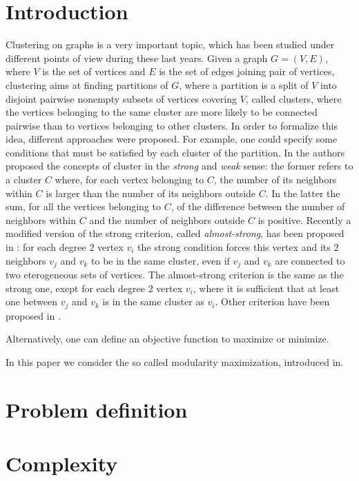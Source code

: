 \section{Introduction}
Clustering on graphs is a very important topic, which has been studied under different points of view during these last years. Given a graph $G=(V,E)$, where $V$ is the set of vertices and $E$ is the set of edges joining pair of vertices, clustering aims at finding partitions of $G$, where a partition is a split of $V$ into disjoint pairwise nonempty subsets of vertices covering $V$, called clusters, where the vertices belonging to the same cluster are more likely to be connected pairwise than to vertices belonging to other clusters. In order to formalize this idea, different approaches were proposed. 
For example, one could specify some conditions that must be satisfied by each cluster of the partition. In \cite{Radicchi} the authors proposed the concepts of cluster in the \emph{strong} and \emph{weak} sense: the former refers to a cluster $C$ where, for each vertex belonging to $C$, the number of its neighbors within $C$ is larger than the number of its neighbors outside $C$. In the latter the sum, for all the vertices belonging to $C$, of the difference between the number of neighbors within $C$ and the number of neighbors outside $C$ is positive. Recently a modified version of the strong criterion, called \emph{almost-strong}, has been proposed in \cite{PhysRevE.85.046113}: for each degree 2 vertex $v_i$ the strong condition forces this vertex and its 2 neighbors $v_j$ and $v_k$ to be in the same cluster, even if $v_j$ and $v_k$ are connected to two eterogeneous sets of vertices. The almost-strong criterion is the same as the strong one, exept for each degree 2 vertex $v_i$, where it is sufficient that at least one between $v_j$ and $v_k$ is in the same cluster as $v_i$. Other criterion have been proposed in \cite{wasserman1994,PhysRevE.78.026121,1082924}.

Alternatively, one can define an objective function to maximize or minimize. 

In this paper we consider the so called modularity maximization, introduced in.

\section{Problem definition}

\section{Complexity}

